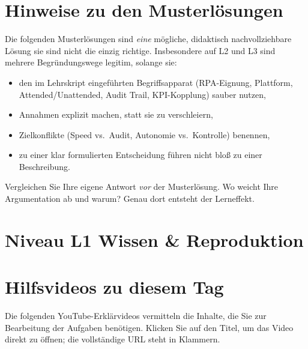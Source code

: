 \documentclass[11pt,a4paper,oneside]{article}
\begin{document}
\section*{Hinweise zu den Musterl\"osungen}
\thispagestyle{plain}

\noindent Die folgenden Musterl\"osungen sind \emph{eine} m\"ogliche, didaktisch nachvollziehbare L\"osung \textendash{} sie sind nicht die einzig richtige. Insbesondere auf L2 und L3 sind mehrere Begr\"undungswege legitim, solange sie:

\begin{itemize}
  \item den im Lehrskript eingef\"uhrten Begriffsapparat (RPA-Eignung, Plattform, Attended/Unattended, Audit Trail, KPI-Kopplung) sauber nutzen,
  \item Annahmen explizit machen, statt sie zu verschleiern,
  \item Zielkonflikte (Speed vs.\ Audit, Autonomie vs.\ Kontrolle) benennen,
  \item zu einer klar formulierten Entscheidung f\"uhren \textendash{} nicht blo{\ss} zu einer Beschreibung.
\end{itemize}

\begin{infobox}
Vergleichen Sie Ihre eigene Antwort \emph{vor} der Musterl\"osung. Wo weicht Ihre Argumentation ab \textendash{} und warum? Genau dort entsteht der Lerneffekt.
\end{infobox}

\clearpage

\section*{Niveau L1 \textendash{} Wissen \& Reproduktion}

\section*{Hilfsvideos zu diesem Tag}
\thispagestyle{plain}

\noindent Die folgenden YouTube-Erkl\"arvideos vermitteln die Inhalte, die Sie zur Bearbeitung der Aufgaben ben\"otigen. Klicken Sie auf den Titel, um das Video direkt zu \"offnen; die vollst\"andige URL steht in Klammern.
\end{document}
